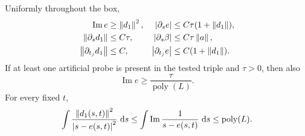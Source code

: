 \begin{lemma}
\label{imp:schur-estimates}
Uniformly throughout the box,
\begin{align}
 \operatorname{Im}e&\ge\left\lVert d_1\right\rVert^2,
 &\left\lvert\partial_s e\right\rvert&\le C\tau(1+\left\lVert d_1\right\rVert),
 \label{imp:derivatives-a}\\
 \left\lVert\partial_s d_1\right\rVert&\le C\tau,
 &\left\lvert\partial_s\beta\right\rvert&\le C\tau\left\lVert a\right\rVert,
 \label{imp:derivatives-b}\\
 \left\lVert\partial_{t_j}d_1\right\rVert&\le C,
 &\left\lvert\partial_{t_j}e\right\rvert&\le C(1+\left\lVert d_1\right\rVert).
 \label{imp:derivatives-c}
\end{align}
If at least one artificial probe is present in the tested triple and
$\tau>0$, then also
\begin{equation}
 \operatorname{Im}e\ge\frac{\tau}{\operatorname{poly}(L)}.
 \label{imp:probe-floor}
\end{equation}
For every fixed $t$,
\begin{equation}
 \int\frac{\left\lVert d_1(s,t)\right\rVert^2}{\left\lvert s-e(s,t)\right\rvert^2}\,\,\mathrm d s
 \le\int\operatorname{Im}\frac1{s-e(s,t)}\,\,\mathrm d s
 \le\operatorname{poly}(L).
 \label{imp:s-integral}
\end{equation}
\end{lemma}

